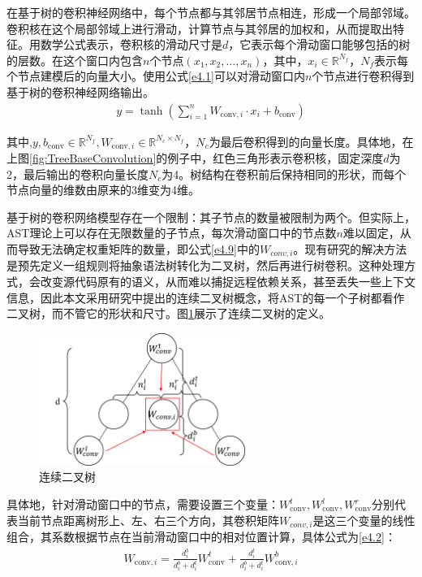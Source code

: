 在基于树的卷积神经网络中，每个节点都与其邻居节点相连，形成一个局部邻域。卷积核在这个局部邻域上进行滑动，计算节点与其邻居的加权和，从而提取出特征。用数学公式表示，卷积核的滑动尺寸是$d$，它表示每个滑动窗口能够包括的树的层数。在这个窗口内包含$n$个节点$\left(x_1,x_2,\ldots,x_n\right)$，其中，$x_i \in \mathbb{R}^{N_{f}}$，$N_{f}$表示每个节点建模后的向量大小。使用公式\ref{e4.1}可以对滑动窗口内$n$个节点进行卷积得到基于树的卷积神经网络输出。
\begin{equation}\label{e4.1}
  \begin{split}
    y = \tanh \left(\sum_{i=1}^{n} W_{\text{conv}, i} \cdot x_{i}+b_{\text{conv}}\right)
  \end{split}
\end{equation}

其中,$y, b_{\text{conv}} \in \mathbb{R}^{N_{f}}, W_{\text{conv}, i} \in \mathbb{R}^{N_{c} \times N_{f}}$，$N_{c}$为最后卷积得到的向量长度。具体地，在上图\ref{fig:TreeBaseConvolution}的例子中，红色三角形表示卷积核，固定深度$d$为2，最后输出的卷积向量长度$N_{c}$为4。树结构在卷积前后保持相同的形状，而每个节点向量的维数由原来的3维变为4维。

基于树的卷积网络模型存在一个限制：其子节点的数量被限制为两个。但实际上，AST理论上可以存在无限数量的子节点，每次滑动窗口中的节点数$n$难以固定，从而导致无法确定权重矩阵的数量，即公式\ref{e4.9}中的$W_{conv,i}$。现有研究的解决方法是预先定义一组规则将抽象语法树转化为二叉树，然后再进行树卷积。这种处理方式，会改变源代码原有的语义，从而难以捕捉远程依赖关系，甚至丢失一些上下文信息，因此本文采用研究\cite{8813290}中提出的连续二叉树概念，将AST的每一个子树都看作二叉树，而不管它的形状和尺寸。图\ref{fig:Continuous}展示了连续二叉树的定义。

\begin{figure}[H]
  \centering
  \includegraphics[width=0.6\textwidth]{figures/Continuous Binary Tree.png}
  \caption{连续二叉树}\label{fig:Continuous}
\end{figure}

具体地，针对滑动窗口中的节点，需要设置三个变量：$W_{\text{conv}}^{t},W_{\text{conv}}^{l},W_{\text{conv}}^{r}$分别代表当前节点距离树形上、左、右三个方向，其卷积矩阵$W_{conv,i}$是这三个变量的线性组合，其系数根据节点在当前滑动窗口中的相对位置计算，具体公式为\ref{e4.2}：
\begin{equation}\label{e4.2}
  \begin{split}
    W_{\text{conv}, i}=\frac{d_{i}^{b}}{d_{i}^{b}+d_{i}^{t}} W_{\text{conv}}^{t}+\frac{d_{i}^{t}}{d_{i}^{b}+d_{i}^{t}} W_{\text{conv}, i}^{b}
  \end{split}
\end{equation}

